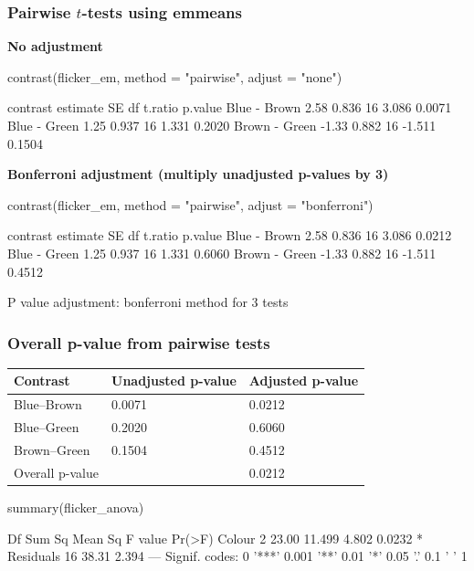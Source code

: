 \documentclass[a4paper]{article}
\begin{document}
\subsubsection{Pairwise \( t \)-tests using emmeans}
\textbf{No adjustment}
\begin{Schunk}
\begin{Sinput}
contrast(flicker_em, method = "pairwise", adjust = "none")
\end{Sinput}
\begin{Soutput}
 contrast      estimate    SE df t.ratio p.value
 Blue - Brown      2.58 0.836 16   3.086  0.0071
 Blue - Green      1.25 0.937 16   1.331  0.2020
 Brown - Green    -1.33 0.882 16  -1.511  0.1504
\end{Soutput}
\end{Schunk}
\textbf{Bonferroni adjustment (multiply unadjusted p-values by 3)}
\begin{Schunk}
\begin{Sinput}
contrast(flicker_em, method = "pairwise", adjust = "bonferroni")
\end{Sinput}
\begin{Soutput}
 contrast      estimate    SE df t.ratio p.value
 Blue - Brown      2.58 0.836 16   3.086  0.0212
 Blue - Green      1.25 0.937 16   1.331  0.6060
 Brown - Green    -1.33 0.882 16  -1.511  0.4512

P value adjustment: bonferroni method for 3 tests 
\end{Soutput}
\end{Schunk}
\subsubsection{Overall p-value from pairwise tests}
\begin{table}[H]
	\begin{tabular}{@{}lll@{}}
	\toprule
	\textbf{Contrast} & \textbf{Unadjusted p-value} & \textbf{Adjusted p-value} \\ \midrule
	Blue--Brown        & 0.0071                      & 0.0212                   \\
	Blue--Green        & 0.2020                      & 0.6060                   \\
	Brown--Green       & 0.1504                      & 0.4512                   \\ \midrule
	Overall p-value   &                             & 0.0212                    \\ \bottomrule
	\end{tabular}
\end{table}
\begin{Schunk}
\begin{Sinput}
summary(flicker_anova)
\end{Sinput}
\begin{Soutput}
            Df Sum Sq Mean Sq F value Pr(>F)  
Colour       2  23.00  11.499   4.802 0.0232 *
Residuals   16  38.31   2.394                 
---
Signif. codes:  0 '***' 0.001 '**' 0.01 '*' 0.05 '.' 0.1 ' ' 1
\end{Soutput}
\end{Schunk}
\end{document}
